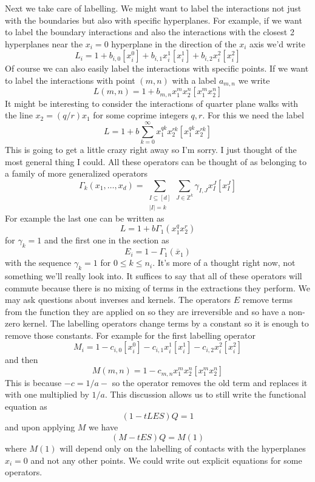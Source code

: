 \documentclass[12pt]{article}
\newcommand{\ze}{\mathbb{Z}}
\theoremstyle{definition} \newtheorem{definition}[theorem]{Definition}
\newcommand{\ol}[1]{\overline{#1}}
\begin{document}
Next we take care of labelling. We might want to label the interactions not just with the boundaries but also with specific hyperplanes. For example, if we want to label the boundary interactions and also the interactions with the closest 2 hyperplanes near the $x_i = 0$ hyperplane in the direction of the $x_i$ axis we'd write
\[
    L_i = 1+ b_{i,0}[x_i^0]+ b_{i,1}x_i^1[x_i^1]+ b_{i,2}x_i^2[x_i^2]
\]
Of course we can also easily label the interactions with specific points. If we want to label the interactions with point $(m,n)$ with a label $a_{m,n}$ we write
\[
	L(m,n)= 1 + b_{m,n}x_1^m x_2^n[x_1^m x_2^n]
\]
It might be interesting to consider the interactions of quarter plane walks with the line $x_2 = (q/r)x_1$ for some coprime integers $q, r$. For this we need the label
\[
   L = 1 + b\sum_{k=0}^{\infty}x_1^{qk}x_2^{rk}[x_1^{qk} x_2^{rk}]
\]
This is going to get a little crazy right away so I'm sorry. I just thought of the most general thing I could. All these operators can be thought of as belonging to a family of more generalized operators
\[
    \Gamma_k(x_1,\ldots,x_d) = \sum_{\substack{I\subseteq [d]\\ |I| = k}}\sum_{J \in \ze^k} \gamma_{I,J} x_I^J[x_I^J]
\]
For example the last one can be written as
\[
    L = 1 + b \Gamma_1(x_1^qx_2^r)
\]
for $\gamma_k = 1$ and the first one in the section as
\[
  E_i = 1 - \Gamma_1(\ol{x}_1)
\]
with the sequence $\gamma_k = 1$ for $0\leq k \leq n_i$. It's more of a thought right now, not something we'll really look into. It suffices to say that all of these operators will commute because there is no mixing of terms in the extractions they perform. We may ask questions about inverses and kernels. The operators $E$ remove terms from the function they are applied on so they are irreversible and so have a non-zero kernel. The labelling operators change terms by a constant so it is enough to remove those constants. For example for the first labelling operator
\[
	M_i = 1- c_{i,0}[x_i^0]- c_{i,1}x_i^1[x_i^1]- c_{i,2}x_i^2[x_i^2]
\]
and then
\[
	M(m,n)= 1 - c_{m,n}x_1^m x_2^n[x_1^m x_2^n]
\]
This is because $-c = 1/a - $ so the operator removes the old term and replaces it with one multiplied by $1/a$. This discussion allows us to still write the functional equation as
\[
	(1- tLES)Q = 1
\]
and upon applying $M$ we have
\[
	(M - tES)Q = M(1)
\]
where $M(1)$ will depend only on the labelling of contacts with the hyperplanes $x_i = 0$ and not any other points. We could write out explicit equations for some operators.

\end{document}
